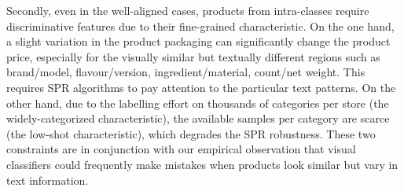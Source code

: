 \documentclass[runningheads]{llncs}
\begin{document}
Secondly, even in the well-aligned cases, products from intra-classes require discriminative features due to their fine-grained characteristic. On the one hand, a slight variation in the product packaging can significantly change the product price, especially for the visually similar but textually different regions such as brand/model, flavour/version, ingredient/material, count/net weight. This requires SPR algorithms to pay attention to the particular text patterns. On the other hand, due to the labelling effort on thousands of categories per store (the widely-categorized characteristic), the available samples per category are scarce (the low-shot characteristic), which degrades the SPR robustness. These two constraints are in conjunction with our empirical observation that visual classifiers could frequently make mistakes when products look similar but vary in text information.



\end{document}
